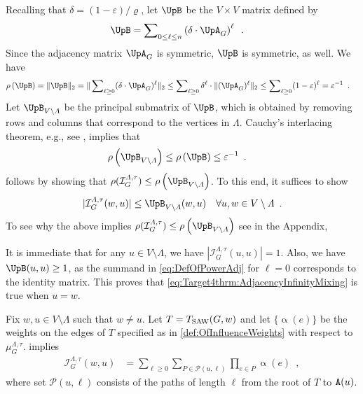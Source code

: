 \documentclass[11pt,reqno]{amsart}
\numberwithin{equation}{section}
\newcommand{\cI}{{\mathcal{I}}}
\newcommand{\cP}{{\mathcal{P}}}
\newcommand{\applegreen}[1]{ {\color{applegreen}#1}}
\newcommand{\blue}[1]{{\color{blue}#1}}
\newcommand{\goldenbrown}[1]{{\color{goldenbrown}#1}}
\newcommand{\red}[1]{{\color{red}#1}}
\newcommand{\Tsaw}{T_{\rm SAW}}
\newcommand{\cp}{{\tt A}}
\newcommand{\infmatrix}{\cI}
\newcommand{\spradius}{{\rho}}
\newcommand{\norm}[2]{\goldenbrown{\|} #1 \goldenbrown{\|}_{#2}}
\newcommand{\abs}[1]{\blue{|}#1\blue{|}}
\newcommand{\Adjacency}{{\UpA}}
\newcommand{\powadj}{{{\UpB}}}
\newcommand{\aspradius}{{\varrho}}
\renewcommand{\applegreen}[1]{#1}
\renewcommand{\blue}[1]{#1}
\renewcommand{\goldenbrown}[1]{#1}
\renewcommand{\red}[1]{#1}
\newcommand{\ke}{\blue{e}}
\newcommand{\kell}{{\color{green(pigment)}\ell}}%
\newcommand{\kP}{\goldenbrown{P}}
\newcommand{\ku}{\red{u}}
\newcommand{\kw}{\blue{w}}
\renewcommand{\ke}{e}
\renewcommand{\kell}{\ell}
\renewcommand{\kP}{P}
\renewcommand{\ku}{u}
\renewcommand{\kw}{w}
\newcommand{\infweight}{\upalpha}
\begin{document}
Recalling that $\delta=(1-\varepsilon)/\aspradius$, let $\powadj$ be the $V\times V$ matrix defined by
\begin{align}\label{eq:DefOfPowerAdj}
 \powadj&= \sum\nolimits_{0\leq \kell \leq n} \left( \delta \cdot \Adjacency_G\right)^{\kell} \enspace.
\end{align}
Since the adjacency matrix $\Adjacency_G$ is symmetric,  $\powadj$ is symmetric, as well. We have 
%
\begin{align}\nonumber
\spradius\left (\powadj \right ) & = \norm{ \powadj}{2} = \norm{ \sum\nolimits_{\kell\geq 0}(\delta\cdot \Adjacency_G)^{\kell}}{2} 
\leq \sum\nolimits_{\kell\geq 0} \delta^{\kell} \cdot \norm{ (\Adjacency_G)^{\kell}}{2}  \leq \sum\nolimits_{\kell\geq 0}(1-\varepsilon)^{\kell} =\varepsilon^{-1} \enspace.
\end{align}
%
Let $\powadj_{V\setminus \Lambda}$ be the principal submatrix of $\powadj$,  which is obtained by 
removing rows and columns that correspond to the vertices in $\Lambda$. 
%
Cauchy’s interlacing theorem, e.g., see \cite{MatrixAnalysis}, implies that
\begin{align}
\spradius\left (\powadj_{V\setminus \Lambda} \right )&\leq \spradius\left (\powadj \right ) \leq \varepsilon^{-1}\enspace.
\end{align}
 follows by showing that $\spradius( \infmatrix^{\Lambda,\tau}_{G} ) \leq \spradius\left( \powadj_{V\setminus \Lambda} \right)$.
% 
To this end,  it suffices to show  
\begin{align}\label{eq:Target4thrm:AdjacencyInfinityMixing}
 \abs{\infmatrix^{\Lambda,\tau}_{G} (\kw,\ku)}&\leq \powadj_{V\setminus \Lambda}(\kw,\ku) & \forall \ku,\kw\in V\setminus \Lambda \enspace. 
\end{align}
To see why the above implies $\spradius( \infmatrix^{\Lambda,\tau}_{G} ) \leq \spradius\left( \powadj_{V\setminus \Lambda} \right)$ see   in the Appendix,


It is immediate that for any $\ku\in V\setminus \Lambda$, we have $\abs{\infmatrix^{\Lambda,\tau}_{G}(\ku,\ku) } =1$.
Also, we have $\powadj(\ku,\ku)\geq 1$, as the summand in \eqref{eq:DefOfPowerAdj} for $\kell=0$ corresponds to 
the identity matrix. This proves that \eqref{eq:Target4thrm:AdjacencyInfinityMixing} is true when $\ku=\kw$.

Fix $\kw,\ku\in V\setminus \Lambda$ such that $\kw\neq \ku$.  Let $T=\Tsaw(G,\kw)$ and let $\{ \infweight(\ke)\}$ be the weights 
on the edges of $T$ specified as in \eqref{def:OfInfluenceWeights} with respect to $\mu^{\Lambda,\tau}_G$.    implies
% 
%
\begin{align}\label{eq:AdjacencyInfinityMixingTsawConstruction}
 \infmatrix^{\Lambda,\tau}_{G}(\kw,\ku) &=\sum\nolimits_{\kell\geq 0}\sum\nolimits_{\kP\in \cP(\ku,\kell)}\prod\nolimits_{\ke\in \kP}\infweight(\ke)\enspace, 
\end{align}
%
where set $\cP(\ku,\kell)$ consists of the paths of length $\kell$ from the root of $T$ to $\cp(\ku)$. 
\end{document}
